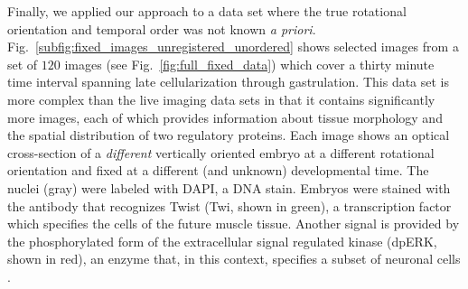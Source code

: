 \documentclass{pnastwo}
\makeatletter
\newcommand{\SI}[0]{{\it SI Materials and Methods}}
\newcommand{\fig}[0]{Fig.}
\newcommand{\customlabel}[2]{%
\protected@write \@auxout {}{\string \newlabel {#1}{{#2}{}}}}
\makeatother
\begin{document}
\begin{article}
Finally, we applied our approach to a data set where the true rotational orientation and temporal order was not known {\it a priori}.
%
\fig~\ref{subfig:fixed_images_unregistered_unordered} shows selected images from a set of $120$ images (see \fig~\ref{fig:full_fixed_data}) which cover a thirty minute time interval spanning late cellularization through gastrulation.
%
This data set is more complex than the live imaging data sets in that it contains significantly more images, each of which provides information about tissue morphology and the spatial distribution of two regulatory proteins.
%
Each image shows an optical cross-section of a {\em different} vertically oriented embryo at a different rotational orientation and fixed at a different (and unknown) developmental time.
%
The nuclei (gray) were labeled with DAPI, a DNA stain.
%
Embryos were stained with the antibody that recognizes Twist (Twi, shown in green), a transcription factor which specifies the cells of the future muscle tissue.
%
Another signal is provided by the phosphorylated form of the extracellular signal regulated kinase (dpERK, shown in red), an enzyme that, in this context, specifies a subset of neuronal cells \cite{Lim2013kinetics}.



\end{article}
\end{document}

